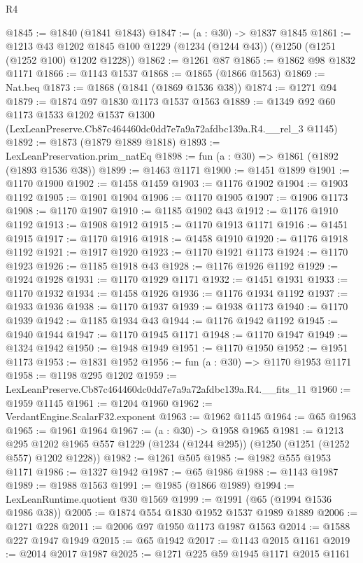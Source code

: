 \begin{lexlean}{R4}
\begin{coremodule}
@1845 := @1840 (@1841 @1843)
@1847 := (a : @30) -> @1837 @1845
@1861 := @1213
    @43
    @1202
    @1845
    @100
    @1229
    (@1234 (@1244 @43))
    (@1250 (@1251 (@1252 @100) @1202 @1228))
@1862 := @1261 @87
@1865 := @1862 @98 @1832 @1171
@1866 := @1143 @1537
@1868 := @1865 (@1866 @1563)
@1869 := Nat.beq
@1873 := @1868 (@1841 (@1869 @1536 @38))
@1874 := @1271 @94
@1879 := @1874 @97 @1830 @1173 @1537 @1563
@1889 := @1349
    @92
    @60
    @1173
    @1533
    @1202
    @1537
    @1300
    (LexLeanPreserve.Cb87c464460dc0dd7e7a9a72afdbc139a.R4.__rel_3 @1145)
@1892 := @1873 (@1879 @1889 @1818)
@1893 := LexLeanPreservation.prim_natEq
@1898 := fun (a : @30) => @1861 (@1892 (@1893 @1536 @38))
@1899 := @1463 @1171
@1900 := @1451 @1899
@1901 := @1170 @1900
@1902 := @1458 @1459
@1903 := @1176 @1902
@1904 := @1903 @1192
@1905 := @1901 @1904
@1906 := @1170 @1905
@1907 := @1906 @1173
@1908 := @1170 @1907
@1910 := @1185 @1902 @43
@1912 := @1176 @1910 @1192
@1913 := @1908 @1912
@1915 := @1170 @1913 @1171
@1916 := @1451 @1915
@1917 := @1170 @1916
@1918 := @1458 @1910
@1920 := @1176 @1918 @1192
@1921 := @1917 @1920
@1923 := @1170 @1921 @1173
@1924 := @1170 @1923
@1926 := @1185 @1918 @43
@1928 := @1176 @1926 @1192
@1929 := @1924 @1928
@1931 := @1170 @1929 @1171
@1932 := @1451 @1931
@1933 := @1170 @1932
@1934 := @1458 @1926
@1936 := @1176 @1934 @1192
@1937 := @1933 @1936
@1938 := @1170 @1937
@1939 := @1938 @1173
@1940 := @1170 @1939
@1942 := @1185 @1934 @43
@1944 := @1176 @1942 @1192
@1945 := @1940 @1944
@1947 := @1170 @1945 @1171
@1948 := @1170 @1947
@1949 := @1324 @1942
@1950 := @1948 @1949
@1951 := @1170 @1950
@1952 := @1951 @1173
@1953 := @1831 @1952
@1956 := fun (a : @30) => @1170 @1953 @1171
@1958 := @1198 @295 @1202
@1959 := LexLeanPreserve.Cb87c464460dc0dd7e7a9a72afdbc139a.R4.__fits_11
@1960 := @1959 @1145
@1961 := @1204 @1960
@1962 := VerdantEngine.ScalarF32.exponent
@1963 := @1962 @1145
@1964 := @65 @1963
@1965 := @1961 @1964
@1967 := (a : @30) -> @1958 @1965
@1981 := @1213
    @295
    @1202
    @1965
    @557
    @1229
    (@1234 (@1244 @295))
    (@1250 (@1251 (@1252 @557) @1202 @1228))
@1982 := @1261 @505
@1985 := @1982 @555 @1953 @1171
@1986 := @1327 @1942
@1987 := @65 @1986
@1988 := @1143 @1987
@1989 := @1988 @1563
@1991 := @1985 (@1866 @1989)
@1994 := LexLeanRuntime.quotient @30 @1569
@1999 := @1991 (@65 (@1994 @1536 @1986 @38))
@2005 := @1874 @554 @1830 @1952 @1537 @1989 @1889
@2006 := @1271 @228
@2011 := @2006 @97 @1950 @1173 @1987 @1563
@2014 := @1588 @227 @1947 @1949
@2015 := @65 @1942
@2017 := @1143 @2015 @1161
@2019 := @2014 @2017 @1987
@2025 := @1271 @225 @59 @1945 @1171 @2015 @1161

\end{coremodule}
\end{lexlean}

